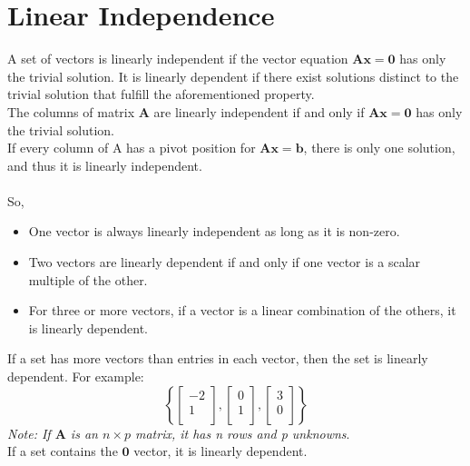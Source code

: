 \documentclass[nobib]{tufte-handout}
\begin{document}
\section{Linear Independence}
A set of vectors is linearly independent if the vector equation $\mathbf{Ax=0}$
has only the trivial solution. It is linearly dependent if there exist
solutions distinct to the trivial solution that fulfill the aforementioned
property.\\ The columns of matrix $\mathbf{A}$ are linearly independent if and
only if $\mathbf{Ax=0}$ has only the trivial solution.\\ If every column of A
has a pivot position for $\mathbf{Ax=b}$, there is only one solution, and thus
it is linearly independent.\\~\\ So,
\begin{itemize}
    \item One vector is always linearly independent as long as it is non-zero.
    \item Two vectors are linearly dependent if and only if one vector is a scalar
          multiple of the other.
    \item For three or more vectors, if a vector is a linear combination of the others,
          it is linearly dependent.
\end{itemize}
If a set has more vectors than entries in each vector, then the set is linearly dependent. For example:
\begin{equation*}
    \left\{
    \begin{bmatrix}
        -2 \\ 1 \\
    \end{bmatrix},
    \begin{bmatrix}
        0 \\ 1 \\
    \end{bmatrix},
    \begin{bmatrix}
        3 \\ 0 \\
    \end{bmatrix}
    \right\}
\end{equation*}
\textit{Note: If $\mathbf{A}$ is an $n \times p$ matrix, it has n rows and p unknowns}.\\
If a set contains the $\mathbf{0}$ vector, it is linearly dependent.\\
\end{document}
